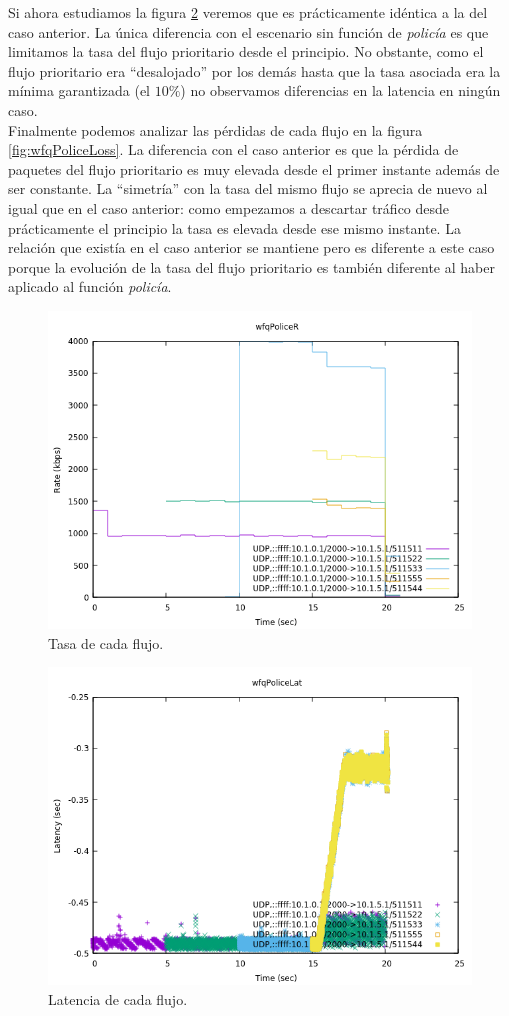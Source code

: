 \documentclass[11pt]{article}
\begin{document}
            Si ahora estudiamos la figura \ref{fig:wfqPoliceLat} veremos que es prácticamente idéntica a la del caso anterior. La única diferencia con el escenario sin función de \textit{policía} es que limitamos la tasa del flujo prioritario desde el principio. No obstante, como el flujo prioritario era ``desalojado'' por los demás hasta que la tasa asociada era la mínima garantizada (el $10\%$) no observamos diferencias en la latencia en ningún caso.\\

            Finalmente podemos analizar las pérdidas de cada flujo en la figura \ref{fig:wfqPoliceLoss}. La diferencia con el caso anterior es que la pérdida de paquetes del flujo prioritario es muy elevada desde el primer instante además de ser constante. La ``simetría'' con la tasa del mismo flujo se aprecia de nuevo al igual que en el caso anterior: como empezamos a descartar tráfico desde prácticamente el principio la tasa es elevada desde ese mismo instante. La relación que existía en el caso anterior se mantiene pero es diferente a este caso porque la evolución de la tasa del flujo prioritario es también diferente al haber aplicado al función \textit{policía}.

            \begin{figure}
                \centering
                \includegraphics[width=0.6\linewidth]{wfqPoliceR.png}
                \caption{Tasa de cada flujo.}
                \label{fig:wfqPoliceR}
            \end{figure}

            \begin{figure}
                \centering
                \includegraphics[width=0.6\linewidth]{wfqPoliceLat.png}
                \caption{Latencia de cada flujo.}
                \label{fig:wfqPoliceLat}
            \end{figure}
\end{document}
